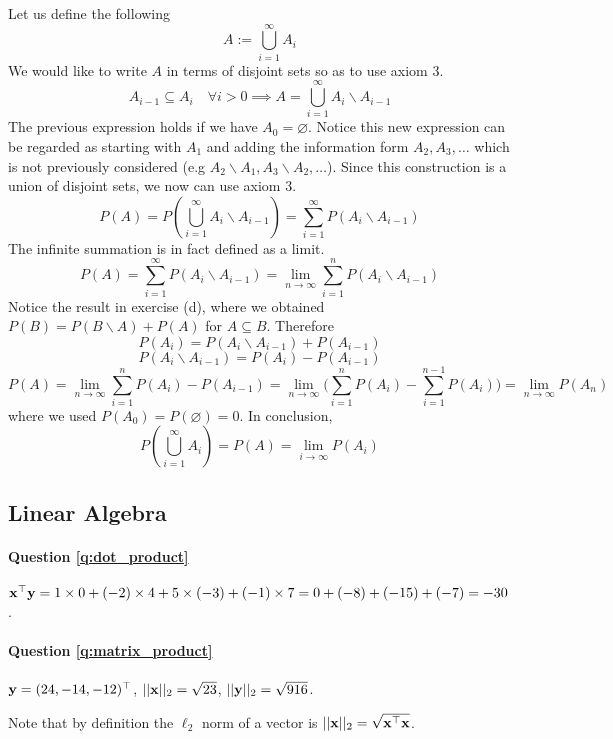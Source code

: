 \begin{enumerate}[label=\alph*.]
Let us define the following
\[
A := \bigcup_{i=1}^{\infty} A_{i}
\]
We would like to write $A$ in terms of disjoint sets so as to use axiom 3.
\[
A_{i-1} \subseteq A_i \quad \forall i > 0 \implies A = \bigcup_{i=1}^{\infty} A_{i}\backslash A_{i-1}
\]
The previous expression holds if we have $A_{0} = \varnothing$. Notice this new expression can be regarded as starting with $A_1$ and adding the information form $A_2, A_3,\dots$ which is not previously considered (e.g $A_2 \backslash A_1, A_3 \backslash A_2, \dots$). Since this construction is a union of disjoint sets, we now can use axiom 3.
\[
P(A) = P\left(\bigcup_{i=1}^{\infty} A_{i}\backslash A_{i-1}\right) = \sum_{i=1}^\infty P(A_{i}\backslash A_{i-1})
\]
The infinite summation is in fact defined as a limit.
\[
P(A) = \sum_{i=1}^\infty P(A_{i}\backslash A_{i-1}) = \lim_{n\xrightarrow{}\infty} \sum_{i=1}^n P(A_{i}\backslash A_{i-1})
\]
Notice  the result in exercise (d), where we obtained $P(B) = P(B\backslash A) + P(A)$ for $A \subseteq B$. Therefore
\[
P(A_i) = P(A_{i}\backslash A_{i-1}) + P(A_{i-1})
\]
\[
 P(A_{i}\backslash A_{i-1}) = P(A_i) - P(A_{i-1})
\]
\[
P(A) = \lim_{n\xrightarrow{}\infty} \sum_{i=1}^n P(A_i) - P(A_{i-1}) = \lim_{n\xrightarrow{}\infty} \bigg(\sum_{i=1}^n P(A_i) - \sum_{i=1}^{n-1} P(A_{i})\bigg) = \lim_{n\xrightarrow{}\infty} P(A_n)
\]
where we used $P(A_0) = P(\varnothing) = 0$. In conclusion,
\[
P\left(\bigcup_{i=1}^{\infty} A_{i}\right) = P(A) = \lim_{i\xrightarrow{}\infty} P(A_i)
\]
\end{enumerate}

\subsection{Linear Algebra}

\paragraph{Question \ref{q:dot_product}}
$\mathbf{x}^\top \mathbf{y} = 1 \times 0 + (-2) \times 4 + 5 \times (-3) + (-1) \times 7 = 0 + (-8) + (-15) + (-7) = -30$.

\paragraph{Question \ref{q:matrix_product}}
$\mathbf{y} = (24, -14, -12)^\top$, $|| \mathbf{x} ||_2 = \sqrt{23}$, $|| \mathbf{y} ||_2 = \sqrt{916}$.

Note that by definition the $\ell_2$ norm of a vector is $|| \mathbf{x} ||_2 = \sqrt{\mathbf{x}^\top \mathbf{x}}$.

